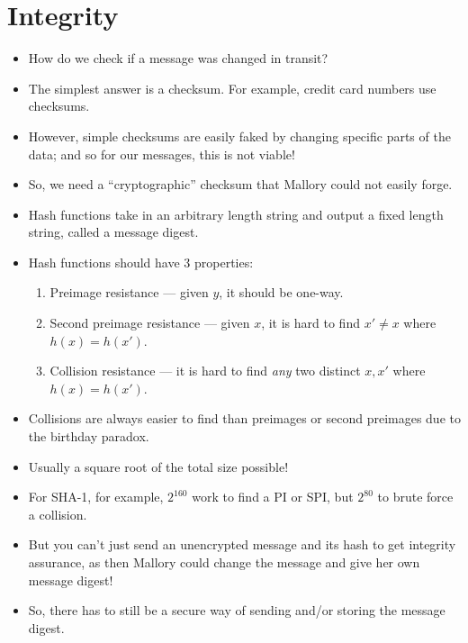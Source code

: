 \documentclass{article}
\begin{document}
\section{Integrity}
\begin{itemize}
    \item How do we check if a message was changed in transit?
    \item The simplest answer is a checksum.  For example, credit card numbers use checksums.
    \item However, simple checksums are easily faked by changing specific parts of the data; and so for our messages, this is not viable!
    \item So, we need a ``cryptographic'' checksum that Mallory could not easily forge.
    \item Hash functions take in an arbitrary length string and output a fixed length string, called a message digest.
    \item Hash functions should have 3 properties:
        \begin{enumerate}
            \item Preimage resistance --- given $y$, it should be one-way.
            \item Second preimage resistance --- given $x$, it is hard to find $x' \neq x$ where $h(x) = h(x')$.
            \item Collision resistance --- it is hard to find \emph{any} two distinct $x, x'$ where $h(x) = h(x')$.
        \end{enumerate}
    \item Collisions are always easier to find than preimages or second preimages due to the birthday paradox.
    \item Usually a square root of the total size possible!
    \item For SHA-1, for example, $2^{160}$ work to find a PI or SPI, but $2^{80}$ to brute force a collision.
    \item But you can't just send an unencrypted message and its hash to get integrity assurance, as then Mallory could change the message and give her own message digest!
    \item So, there has to still be a secure way of sending and/or storing the message digest.
\end{itemize}
\end{document}
